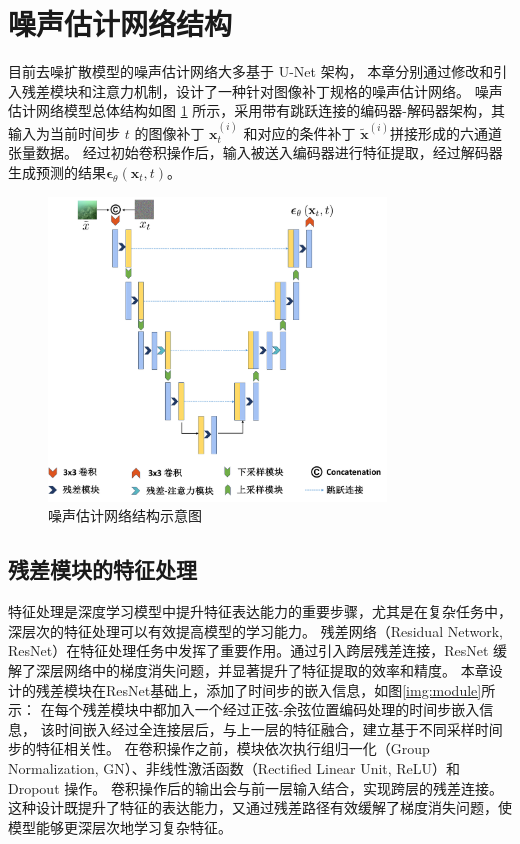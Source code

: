 \section{噪声估计网络结构}
目前去噪扩散模型的噪声估计网络大多基于 U-Net \cite{unet}架构，
本章分别通过修改和引入残差模块和注意力机制，设计了一种针对图像补丁规格的噪声估计网络。
噪声估计网络模型总体结构如图 \ref{img:network} 所示，采用带有跳跃连接的编码器-解码器架构，其输入为当前时间步 $t$ 的图像补丁 $\mathbf{x}^{(i)}_t$ 和对应的条件补丁 $\tilde{\mathbf{x}}^{(i)}$拼接形成的六通道张量数据。
经过初始卷积操作后，输入被送入编码器进行特征提取，经过解码器生成预测的结果$\boldsymbol{\epsilon}_\theta(\mathbf{x}_t, t)$。
\begin{figure}
    \centering 
    \includegraphics[width=0.8\textwidth]{figures/ch3/network.pdf}
    \caption{噪声估计网络结构示意图}
    \label{img:network}
\end{figure}

\subsection{残差模块的特征处理}
特征处理是深度学习模型中提升特征表达能力的重要步骤，尤其是在复杂任务中，深层次的特征处理可以有效提高模型的学习能力。
残差网络（Residual Network, ResNet）\cite{resnet}在特征处理任务中发挥了重要作用。通过引入跨层残差连接，ResNet 缓解了深层网络中的梯度消失问题，并显著提升了特征提取的效率和精度。
本章设计的残差模块在ResNet基础上，添加了时间步的嵌入信息，如图\ref{img:module}所示：
在每个残差模块中都加入一个经过正弦-余弦位置编码处理的时间步嵌入信息，
该时间嵌入经过全连接层后，与上一层的特征融合，建立基于不同采样时间步的特征相关性。
在卷积操作之前，模块依次执行组归一化（Group Normalization, GN）\cite{gn}、非线性激活函数（Rectified Linear Unit, ReLU）\cite{relu}和 Dropout 操作\cite{dropout}。
卷积操作后的输出会与前一层输入结合，实现跨层的残差连接。
这种设计既提升了特征的表达能力，又通过残差路径有效缓解了梯度消失问题，使模型能够更深层次地学习复杂特征。

